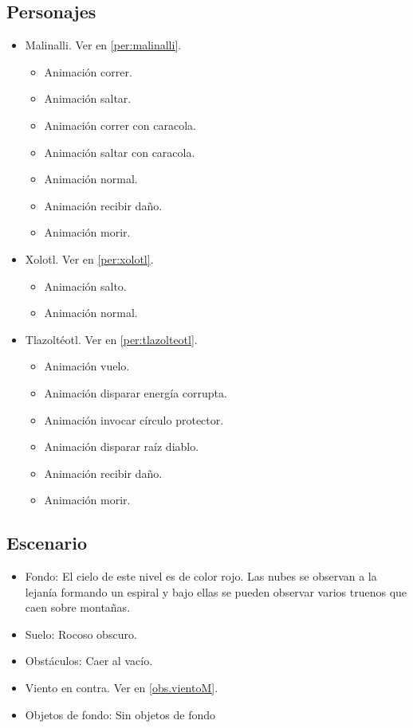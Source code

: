 	\subsection{Personajes}
	\begin{itemize}
		\item Malinalli. Ver en \ref{per:malinalli}.
			\begin{itemize}
			\item Animación correr.
			\item Animación saltar.
			\item Animación correr con caracola.
			\item Animación saltar con caracola.
			\item Animación normal.
			\item Animación recibir daño.
			\item Animación morir.
		\end{itemize}
		\item Xolotl. Ver en \ref{per:xolotl}.
		\begin{itemize}
				\item Animación salto.
				\item Animación normal.
		\end{itemize}
		\item Tlazoltéotl. Ver en \ref{per:tlazolteotl}.
			\begin{itemize}
				\item Animación vuelo.
				\item Animación disparar energía corrupta.
				\item Animación invocar círculo protector.
				\item Animación disparar raíz diablo.
				\item Animación recibir daño.
				\item Animación morir.
			\end{itemize}
	\end{itemize}
\subsection{Escenario}
\begin{itemize} 
	\item Fondo: El cielo de este nivel es de color rojo. Las nubes se observan a la lejanía formando un espiral y bajo ellas se pueden observar varios truenos que caen sobre montañas.
	\item Suelo: Rocoso obscuro.
	\item Obstáculos: Caer al vacío.
	\item Viento en contra. Ver en \ref{obs.vientoM}.
	\item Objetos de fondo: Sin objetos de fondo
\end{itemize}	
